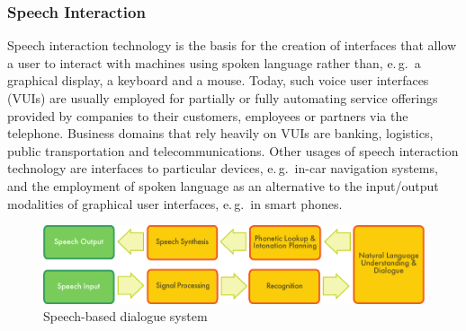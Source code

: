 \begin{multicols}{2}
\subsubsection{Speech Interaction}

Speech interaction technology is the basis for the creation of interfaces that allow a user to interact with machines using spoken language rather than, e.\,g.~a graphical display, a keyboard and a mouse. Today, such voice user interfaces (VUIs) are usually employed for partially or fully automating service offerings provided by companies to their customers, employees or partners via the telephone. Business domains that rely heavily on VUIs are banking, logistics, public transportation and telecommunications. Other usages of speech interaction technology are interfaces to particular devices, e.\,g.~in-car navigation systems, and the employment of spoken language as an alternative to the input/output modalities of graphical user interfaces, e.\,g.~in smart phones.


\begin{figure}[htb]
  \center
  \includegraphics[width=\textwidth]{../_media/english/simple_speech-based_dialogue_architecture}
  \caption{Speech-based dialogue system}
  \label{fig:dialoguearch_en}
\end{figure}



\end{multicols}
